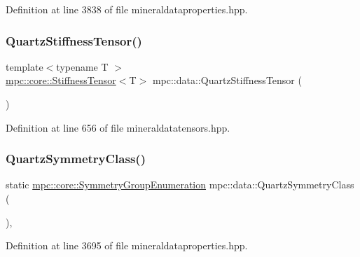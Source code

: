 Definition at line 3838 of file mineraldataproperties.\+hpp.

\mbox{\label{namespacempc_1_1data_ae93bbe5838dc22bf81defc06ed69d05c}} 
\subsubsection{\texorpdfstring{Quartz\+Stiffness\+Tensor()}{QuartzStiffnessTensor()}}
{\footnotesize\ttfamily template$<$typename T $>$ \\
\mbox{\hyperlink{structmpc_1_1core_1_1_stiffness_tensor}{mpc\+::core\+::\+Stiffness\+Tensor}}$<$T$>$ mpc\+::data\+::\+Quartz\+Stiffness\+Tensor (\begin{DoxyParamCaption}{ }\end{DoxyParamCaption})}



Definition at line 656 of file mineraldatatensors.\+hpp.

\mbox{\label{namespacempc_1_1data_abf73077c104b9fed2bbc5010e426e761}} 
\subsubsection{\texorpdfstring{Quartz\+Symmetry\+Class()}{QuartzSymmetryClass()}}
{\footnotesize\ttfamily static \mbox{\hyperlink{namespacempc_1_1core_a9d979684062547055a0ef5c13077bad8}{mpc\+::core\+::\+Symmetry\+Group\+Enumeration}} mpc\+::data\+::\+Quartz\+Symmetry\+Class (\begin{DoxyParamCaption}{ }\end{DoxyParamCaption})\hspace{0.3cm}{\ttfamily [inline]}, {\ttfamily [static]}}



Definition at line 3695 of file mineraldataproperties.\+hpp.

\mbox{\label{namespacempc_1_1data_aa35acd7fdbe35e4b9d5f2654ab82985f}} 
